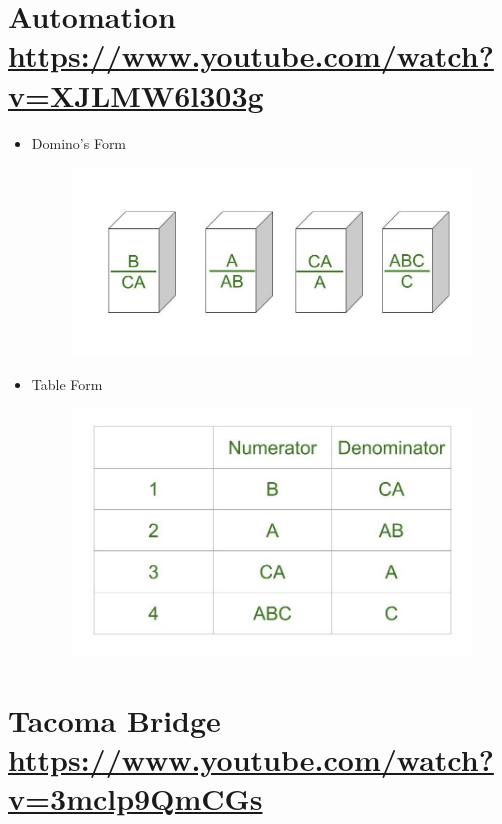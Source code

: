 \documentclass[
	12pt, %
]{fphw}
\begin{document}
\newpage
\section*{{\color{Apricot}Automation} \url{https://www.youtube.com/watch?v=XJLMW6l303g}}


\begin{itemize}
\item Domino's Form
  \begin{figure}[H]
  \centering
  \includegraphics[scale=0.4]{images/dominos.jpg}
\end{figure}
\item Table Form
  \begin{figure}[H]
  \centering
  \includegraphics[scale=0.4]{images/table.jpg}
\end{figure}
\end{itemize}

\section*{{\color{Cerulean}Tacoma Bridge} \url{https://www.youtube.com/watch?v=3mclp9QmCGs}}
\end{document}
